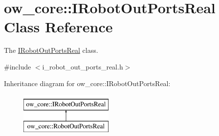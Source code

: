 \hypertarget{classow__core_1_1IRobotOutPortsReal}{}\section{ow\+\_\+core\+:\+:I\+Robot\+Out\+Ports\+Real Class Reference}
\label{classow__core_1_1IRobotOutPortsReal}


The \hyperlink{classow__core_1_1IRobotOutPortsReal}{I\+Robot\+Out\+Ports\+Real} class.  




{\ttfamily \#include $<$i\+\_\+robot\+\_\+out\+\_\+ports\+\_\+real.\+h$>$}

Inheritance diagram for ow\+\_\+core\+:\+:I\+Robot\+Out\+Ports\+Real\+:\begin{figure}[H]
\begin{center}
\leavevmode
\includegraphics[height=2.000000cm]{d6/d66/classow__core_1_1IRobotOutPortsReal}
\end{center}
\end{figure}

